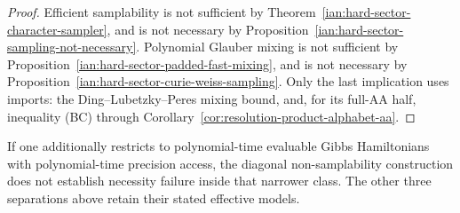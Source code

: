 \begin{proof}
Efficient samplability is not sufficient by
Theorem~\ref{ian:hard-sector-character-sampler}, and is not necessary
by Proposition~\ref{ian:hard-sector-sampling-not-necessary}.
Polynomial Glauber mixing is not sufficient by
Proposition~\ref{ian:hard-sector-padded-fast-mixing}, and is not
necessary by Proposition~\ref{ian:hard-sector-curie-weiss-sampling}.
Only the last implication uses imports: the Ding--Lubetzky--Peres
mixing bound, and, for its full-AA half, inequality (BC) through
Corollary~\ref{cor:resolution-product-alphabet-aa}.
\end{proof}

If one additionally restricts to polynomial-time evaluable Gibbs
Hamiltonians with polynomial-time precision access, the diagonal
non-samplability construction does not establish necessity failure
inside that narrower class. The other three separations above retain
their stated effective models.
